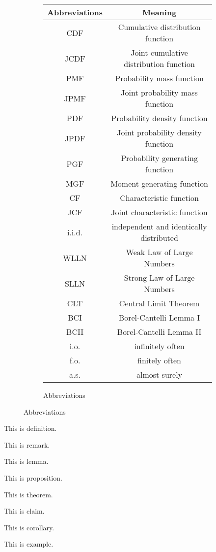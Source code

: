 \documentclass{huhtakm-template-book}
\begin{document}
\begin{figure}[h]
\begin{subfigure}{0.45\textwidth}
        \centering
        \begin{tabular}{cc}
            Abbreviations & Meaning\\
            \hline
            CDF & Cumulative distribution function\\
            JCDF & Joint cumulative distribution function\\
            PMF & Probability mass function\\
            JPMF & Joint probability mass function\\
            PDF & Probability density function\\
            JPDF & Joint probability density function\\
            PGF & Probability generating function\\
            MGF & Moment generating function\\
            CF & Characteristic function\\
            JCF & Joint characteristic function\\
            i.i.d. & independent and identically distributed\\
            WLLN & Weak Law of Large Numbers\\
            SLLN & Strong Law of Large Numbers\\
            CLT & Central Limit Theorem\\
            BCI & Borel-Cantelli Lemma I\\
            BCII & Borel-Cantelli Lemma II\\
            i.o. & infinitely often\\
            f.o. & finitely often\\
            a.s. & almost surely
        \end{tabular}
        \caption{Abbreviations}
    \end{subfigure}
\end{figure}
\begin{defn}
    This is definition.
\end{defn}
\begin{rem}
    This is remark.
\end{rem}
\begin{lem}
    This is lemma.
\end{lem}
\begin{prop}
    This is proposition.
\end{prop}
\begin{thm}
    This is theorem.
\end{thm}
\begin{cla}
    This is claim.
\end{cla}
\begin{cor}
    This is corollary.
\end{cor}
\begin{eg}
    This is example.
\end{eg}
\tableofcontents
\end{document}
